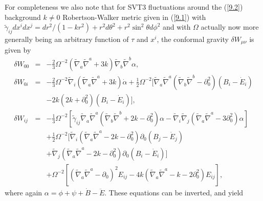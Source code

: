 For completeness we also note that for  SVT3 fluctuations around the (\ref{9.2}) background $k\neq 0$ Robertson-Walker metric given in (\ref{9.1}) with $\tilde{\gamma}_{ij}dx^idx^j=dr^2/(1-kr^2)+r^2d\theta^2+r^2\sin^2\theta d\phi^2$ and with $\Omega$ actually now more generally being an arbitrary function of $\tau$ and $x^i$, the conformal gravity $\delta W_{\mu\nu}$ is given by 
%
\begin{eqnarray}
\delta W_{00}&=& - \tfrac{2}{3} \Omega^{-2} (\tilde\nabla_a\tilde\nabla^a + 3k)\tilde\nabla_b\tilde\nabla^b \alpha,
\nonumber\\ 
\delta W_{0i}&=& -\tfrac{2}{3} \Omega^{-2}  \tilde\nabla_i (\tilde\nabla_a\tilde\nabla^a + 3k)\dot\alpha
+\tfrac12 \Omega^{-2}\bigg[ \tilde\nabla_a\tilde\nabla^a (\tilde\nabla_b \tilde\nabla^b-\partial_0^2)(B_i-\dot{E}_i)
\nonumber\\
&& -2k(2k+\partial_0^2)(B_i-\dot{E}_i)\bigg],
\nonumber\\ 
\delta W_{ij}&=& -\tfrac{1}{3} \Omega^{-2} \left[ \tilde{\gamma}_{ij} \tilde\nabla_a\tilde\nabla^a (\tilde\nabla_b \tilde\nabla^b +2k-\partial_0^2)\alpha - \tilde\nabla_i\tilde\nabla_j(\tilde\nabla_a\tilde\nabla^a - 3\partial_0^2)\alpha \right]
\nonumber\\
&& +\tfrac{1}{2} \Omega^{-2} \bigg[ \tilde\nabla_i ( \tilde\nabla_a\tilde\nabla^a -2k-\partial_0^2) \partial_0 (B_j-\dot{E}_j)
\nonumber\\
&& 
+  \tilde\nabla_j ( \tilde\nabla_a\tilde\nabla^a -2k-\partial_0^2) \partial_0 (B_i-\dot{E}_i)\bigg]
\nonumber\\
&&+ \Omega^{-2}\left[ (\tilde\nabla_a\tilde\nabla^a-\partial_0)^2 E_{ij} - 4k (\tilde\nabla_a\tilde\nabla^a - k-2\partial_0^2)E_{ij} \right],
\label{13.16}
\end{eqnarray}
%
where again $\alpha = \phi + \psi + \dot B - \ddot E$. These equations can be inverted, and yield
%

